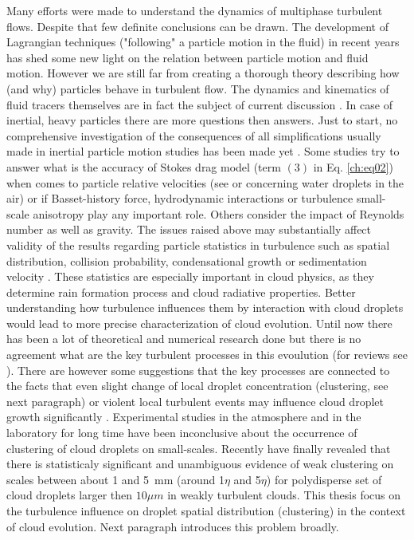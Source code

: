 \documentclass[../main.tex]{subfiles}
\begin{document}
Many efforts were made to understand the dynamics of multiphase turbulent flows. Despite that few definite conclusions can be drawn. The development of Lagrangian techniques ("following" a particle motion in the fluid) in recent years has shed some new light on the relation between particle motion and fluid motion. However we are still far from creating a thorough theory describing how (and why) particles behave in turbulent flow. The dynamics and kinematics of fluid tracers themselves are in fact the subject of current discussion \citep{Biferale2005,Arneodo2008, Toschi2009,Scatamacchia2012,Dhariwal2018}. In case of inertial, heavy particles there are more questions then answers. Just to start, no comprehensive investigation of the consequences of all simplifications usually made in inertial particle motion studies has been made yet \citep{Bourgoin2014}. Some studies try to answer what is the accuracy of Stokes drag model (term $(3)$ in Eq. \ref{ch:eq02}) when comes to particle relative velocities (see \citet{Dou2018} or \citet{Saw2014} concerning water droplets in the air) or if Basset-history force,  hydrodynamic interactions or turbulence small-scale anisotropy play any important role. Others consider the impact of Reynolds number as well as gravity\citep{Ireland2016a, Ireland2016b}. The issues raised above may substantially affect validity of the results regarding particle statistics in turbulence such as spatial distribution, collision probability, condensational growth or sedimentation velocity \citep{Chen2018}. These statistics are especially important in cloud physics, as they determine rain formation process and cloud radiative properties. Better understanding how turbulence influences them by interaction with cloud droplets would lead to more precise characterization of cloud evolution\citep{Bodenschatz2010}. Until now there has been a lot of theoretical and numerical research done but there is no agreement what are the key turbulent processes in this evoulution (for reviews see \citet{Vaillancourt2000, Shaw2003, Devenish2012, Grabowski2013, Pumir2016, Saito2018}). There are however some suggestions that the key processes are connected to the facts that even slight change of local droplet concentration (clustering, see next paragraph) or violent local turbulent events may influence cloud droplet growth significantly \citep{Kostinski2005, Bec2016, Madival2019}. Experimental studies in the atmosphere \citep{Chaumat2001, Pinsky2001, Kostinski2001, Shaw2002, Knyazikhin2005, Marshak2005, Lehmann2007, Glienke2017} and in the laboratory \citep{Jaczewski 2005, Warhaft2008} for long time have been inconclusive about the occurrence of clustering of cloud droplets on small-scales. Recently \citet{Larsen2018} have finally revealed that there is statisticaly significant and unambiguous evidence of weak clustering on scales between about 1 and 5~mm (around 1$\eta$ and 5$\eta$) for polydisperse set of cloud droplets larger then $10\mu m$ in weakly turbulent clouds. This thesis focus on the turbulence influence on droplet spatial distribution (clustering) in the context of cloud evolution. Next paragraph introduces this problem broadly.\\
\end{document}
